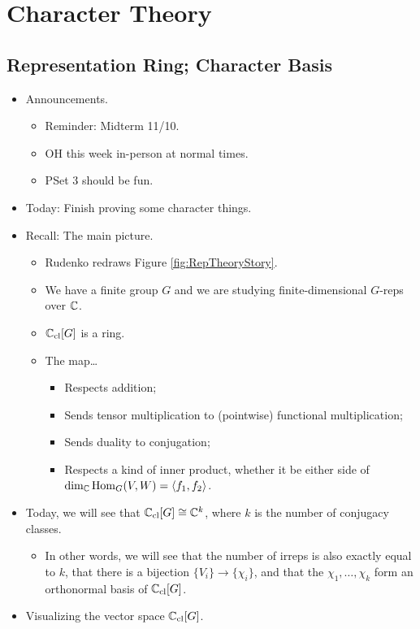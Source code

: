 \documentclass[../notes.tex]{subfiles}
\begin{document}
\chapter{Character Theory}
\section{Representation Ring; Character Basis}
\begin{itemize}
    \item {}Announcements.
    \begin{itemize}
        \item Reminder: Midterm 11/10.
        \item OH this week in-person at normal times.
        \item PSet 3 should be fun.
    \end{itemize}
    \item Today: Finish proving some character things.
    \item Recall: The main picture.
    \begin{itemize}
        \item Rudenko redraws Figure \ref{fig:RepTheoryStory}.
        \item We have a finite group $G$ and we are studying finite-dimensional $G$-reps over $\mathbb{C}$.
        \item $\mathbb{C}_\text{cl}[G]$ is a ring.
        \item The map\dots
        \begin{itemize}
            \item Respects addition;
            \item Sends tensor multiplication to (pointwise) functional multiplication;
            \item Sends duality to conjugation;
            \item Respects a kind of inner product, whether it be either side of $\dim_{\mathbb{C}}\operatorname{Hom}_G(V,W)=\left\langle{f_1,f_2}\right\rangle$.
        \end{itemize}
    \end{itemize}
    \item Today, we will see that $\mathbb{C}_\text{cl}[G]\cong\mathbb{C}^k$, where $k$ is the number of conjugacy classes.
    \begin{itemize}
        \item In other words, we will see that the number of irreps is also exactly equal to $k$, that there is a bijection $\{V_i\}\to\{\chi_i\}$, and that the $\chi_1,\dots,\chi_k$ form an orthonormal basis of $\mathbb{C}_\text{cl}[G]$.
    \end{itemize}
    \item Visualizing the vector space $\mathbb{C}_\text{cl}[G]$.
    \begin{figure}[h!]
        \centering
\end{figure}
\end{itemize}
\end{document}

